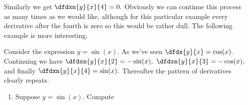   Similarly we get $\dfdxn{y}{x}{4} = 0.$ Obviously we can continue
  this process as many times as we would like, although for this
  particular example every derivative after the fourth is zero so this
  would be rather dull. The following example is more interesting.

\begin{myexample}
  Consider the expression $y=\sin(x).$ As we've seen $\dfdx{y}{x}=
  \cos(x).$ Continuing we have $\dfdxn{y}{x}{2} = -\sin(x),$
  $\dfdxn{y}{x}{3} = -\cos(x),$ and finally $\dfdxn{y}{x}{4} =
  \sin(x).$ Thereafter the pattern of derivatives clearly repeats.
\end{myexample}

\begin{embeddedproblem}{}
  \begin{enumerate}[label={\bf{}(\alph*)}]{}
  \item   Suppose $y=\sin(x).$ Compute
    \begin{enumerate}[label={\bf{}(\roman*)}]{}
      \end{enumerate}
  \end{enumerate}
\end{embeddedproblem}

